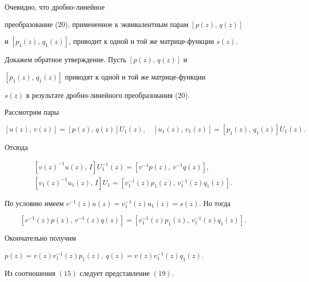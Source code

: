\begin{pf}


Очевидно, что дробно-линейное


преобразование (20), примененное к эквивалентным парам $ [p(z),\, q(z)]$


и $[p_1(z),\, q_1(z)]$, приводит к одной и той же матрице-функции $s(z)$.





Докажем обратное утверждение. Пусть $ [p(z),\, q(z) ]$ и


$[p_1(z),\, q_1(z)]$ приводят к одной и той же матрице-функции


$s(z)$ в результате дробно-линейного преобразования (20).


Рассмотрим пары


$$


[ u(z),\, v(z)]=[p(z),\, q(z) ]U_1(z),


\quad [u_1(z),\, v_1(z) ]=[ p_1(z),\, q_1(z) ]U_1(z).


$$


Отсюда


\begin{gather*}


[v(z)^{-1}u(z),\,I]U_1^{-1}(z)=[v^{-1} p(z),\, v^{-1} q(z)], \\


%


[v_1(z)^{-1}u_1(z),\,I]U_1=


[v_1^{-1}(z) p_1(z),\, v_1^{-1}(z) q_1(z)].


\end{gather*}


По условию имеем $v^{-1}(z)u(z)=v_1^{-1}(z)u_1(z)=s(z)$. Но тогда


$$[ v^{-1}(z)p(z),\, v^{-1}(z)q(z)]=


 [v_1^{-1}(z)p_1(z),\, v_1^{-1}(z)q_1(z)].$$


Окончательно получим


$p(z)=v(z)v_1^{-1}(z)p_1(z), \ q(z)=v(z)v_1^{-1}(z)q_1(z)$.


\end{pf}





\begin{lem}


Из соотношения $(15)$ следует представление $(19)$.


\end{lem}





